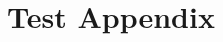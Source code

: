 \documentclass{cmspaper}
\begin{document}

%

%


\appendix
\section{Test Appendix \label{app:testApp}}
%

%

%

%

%

%

%

%

%

%

%
\end{document}
